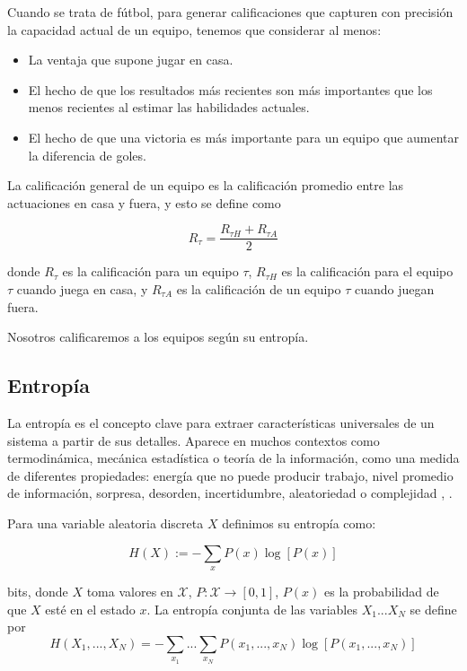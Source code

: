 Cuando se trata de fútbol, para generar calificaciones que capturen con precisión la
capacidad actual de un equipo, tenemos que considerar al menos:
\begin{itemize}
    \item La ventaja que supone jugar en casa.
    \item El hecho de que los resultados más recientes son más importantes que los menos recientes
    al estimar las habilidades actuales.
    \item El hecho de que una victoria es más importante para un equipo que aumentar la diferencia de goles.
\end{itemize}

\begin{definicion} \label{def:ratings}
La calificación general de un equipo es la calificación promedio entre las actuaciones 
en casa y fuera, y esto se define como

$$ R_{\tau}= \frac{R_{\tau H} + R_{\tau A}}{2} $$

donde $R_{\tau}$ es la calificación para un equipo $\tau$, $R_{\tau H}$ es la calificación para el 
equipo $\tau$ cuando juega en casa, y $R_{\tau A}$ es la calificación de un equipo $\tau$ cuando 
juegan fuera. 
\end{definicion}

Nosotros calificaremos a los equipos según su entropía.

\subsection{Entropía}
La entropía es el concepto clave para extraer características universales de un sistema a partir de sus 
detalles. Aparece en muchos contextos como termodinámica, mecánica estadística o teoría de la información, como 
una medida de diferentes propiedades: energía que no puede producir trabajo, nivel promedio de información, sorpresa, 
desorden, incertidumbre, aleatoriedad o complejidad \cite{gen-entr-review}, \cite{t-entropy}.

\begin{definicion}[Entropía] \label{def:entropy}
Para una variable aleatoria discreta $X$ definimos su entropía como:  

$$H(X):= - \sum_{x} P(x)\log[P(x)]$$

bits, donde $X$ toma valores en $\mathcal{X}$, $P:\mathcal{X} \rightarrow [0,1]$, $P(x)$ es la 
probabilidad de que $X$ esté en el estado $x$. La 
entropía conjunta de las variables $X_1...X_N$ se define por 
$$H(X_1,...,X_N)=-\sum_{x_1}...\sum_{x_N}P(x_1,...,x_N)\log[P(x_1,...,x_N)]$$
\end{definicion}

